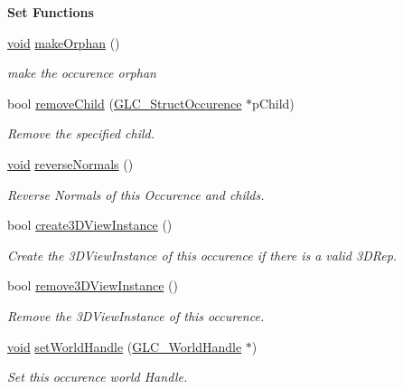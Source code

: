 \begin{Indent}{\bf Set Functions}
\begin{DoxyCompactItemize}
\hyperlink{group___u_a_v_objects_plugin_ga444cf2ff3f0ecbe028adce838d373f5c}{void} \hyperlink{class_g_l_c___struct_occurence_aa4e4c7736a3c850f977e4db788ed6dcc}{make\-Orphan} ()
\begin{DoxyCompactList}\small\item\em make the occurence orphan \end{DoxyCompactList}\item 
bool \hyperlink{class_g_l_c___struct_occurence_aa29c26bbeee9dc84038bc1cfb0c7e68d}{remove\-Child} (\hyperlink{class_g_l_c___struct_occurence}{G\-L\-C\-\_\-\-Struct\-Occurence} $\ast$p\-Child)
\begin{DoxyCompactList}\small\item\em Remove the specified child. \end{DoxyCompactList}\item 
\hyperlink{group___u_a_v_objects_plugin_ga444cf2ff3f0ecbe028adce838d373f5c}{void} \hyperlink{class_g_l_c___struct_occurence_ae9aaa8772d698295120adb3c78786260}{reverse\-Normals} ()
\begin{DoxyCompactList}\small\item\em Reverse Normals of this Occurence and childs. \end{DoxyCompactList}\item 
bool \hyperlink{class_g_l_c___struct_occurence_a973a87eb578f79c70d090045c6fc2e82}{create3\-D\-View\-Instance} ()
\begin{DoxyCompactList}\small\item\em Create the 3\-D\-View\-Instance of this occurence if there is a valid 3\-D\-Rep. \end{DoxyCompactList}\item 
bool \hyperlink{class_g_l_c___struct_occurence_a90af3db3d64b3f12b169413338525a0e}{remove3\-D\-View\-Instance} ()
\begin{DoxyCompactList}\small\item\em Remove the 3\-D\-View\-Instance of this occurence. \end{DoxyCompactList}\item 
\hyperlink{group___u_a_v_objects_plugin_ga444cf2ff3f0ecbe028adce838d373f5c}{void} \hyperlink{class_g_l_c___struct_occurence_a345fae8501db6457db8aee49af80c54d}{set\-World\-Handle} (\hyperlink{class_g_l_c___world_handle}{G\-L\-C\-\_\-\-World\-Handle} $\ast$)
\begin{DoxyCompactList}\small\item\em Set this occurence world Handle. \end{DoxyCompactList}\item 

\end{DoxyCompactItemize}
\end{Indent}
